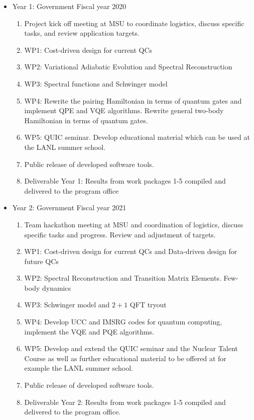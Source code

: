 \documentclass[10pt]{article}
\begin{document}
\begin{itemize}
    \item Year 1: Government Fiscal year 2020
    \begin{enumerate}
        \item Project kick off meeting at MSU to coordinate logistics, discuss
specific tasks, and review application targets.
\item WP1: Cost-driven design for current QCs
\item WP2: Variational Adiabatic Evolution and Spectral Reconstruction
\item WP3: Spectral functions and Schwinger model
\item WP4: Rewrite the pairing Hamiltonian in terms of quantum gates and implement QPE and VQE algorithms. Rewrite general two-body Hamiltonian in terms of quantum gates. 
\item WP5:  QUIC seminar. Develop educational material which can be used at the LANL summer school.
\item Public release of developed software tools.
\item Deliverable Year 1: Results from work packages 1-5 compiled and delivered to the program office
    \end{enumerate}
    \item Year 2: Government Fiscal year 2021
    \begin{enumerate}
        \item Team hackathon meeting at MSU and coordination of logistics, discuss specific tasks and progress. Review and adjustment of targets.
        \item WP1: Cost-driven design for current QCs and Data-driven design for future QCs 
\item WP2: Spectral Reconstruction and Transition Matrix Elements. Few-body dynamics
\item WP3: Schwinger model and $2+1$ QFT tryout
\item WP4: Develop UCC and IMSRG codes for quantum computing, implement the VQE and PQE algorithms.
\item WP5: Develop and extend the QUIC seminar and the Nuclear Talent Course as well as further educational material to be offered at for example the LANL summer school.
\item Public release of developed software tools.
\item Deliverable Year 2: Results from work packages 1-5 compiled and delivered to the program office.
    \end{enumerate}

\end{itemize}
\end{document}
